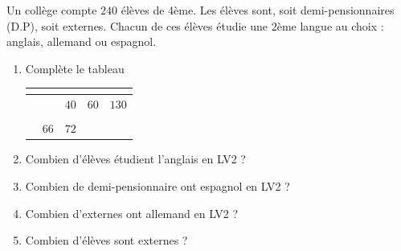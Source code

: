 \documentclass[a4paper,10pt]{report}
\begin{document}
\begin{ex}
Un collège compte $240$ élèves de $4$ème. Les élèves sont, soit demi-pensionnaires (D.P), soit externes. Chacun de ces élèves étudie une $2$ème langue au choix : anglais, allemand ou espagnol.
\begin{enumerate}
\item Complète le tableau
\begin{center}
\renewcommand{\arraystretch}{2}
\begin{tabularx}{\linewidth}{|p{2cm}|*{4}{>{\centering \arraybackslash}X|}}
\cline{2-5}
\multicolumn{1}{c|}{} & \cellcolor{exer1!20}{Anglais} & \cellcolor{exer1!20}{Allemand} & \cellcolor{exer1!20}{Espagnol} & \cellcolor{exer1!20}{Total} \\\hline
\cellcolor{exer1!20}{D.P.} &  & $40$ & $60$ &  $130$  \\\hline
\cellcolor{exer1!20}{Externe} &  &  &  &  \\\hline
\cellcolor{exer1!20}{Total} & $66$ & $72$ &  &   \\\hline
\end{tabularx}
\end{center}
\item Combien d'élèves étudient l'anglais en LV2 ?
\item Combien de demi-pensionnaire ont espagnol en LV2 ?
\item Combien d'externes ont allemand en LV2 ?
\item Combien d'élèves sont externes ?
\end{enumerate}
\end{ex}
\end{document}

